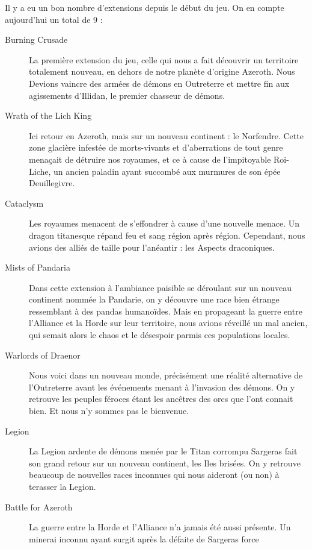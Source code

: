 \documentclass{article}
\begin{document}
Il y a eu un bon nombre d'extensions depuis le début du jeu. On en compte aujourd'hui un
total de 9 :

\begin{description}
    \item[Burning Crusade] La première extension du jeu, celle qui nous a fait découvrir
        un territoire totalement nouveau, en dehors de notre planète d'origine Azeroth. Nous
        Devions vaincre des armées de démons en Outreterre et mettre fin aux agissements
        d'Illidan, le premier chasseur de démons.
    \item[Wrath of the Lich King] Ici retour en Azeroth, mais sur un nouveau continent :
        le Norfendre. Cette zone glacière infestée de morts-vivants et d'aberrations de tout
        genre menaçait de détruire nos royaumes, et ce à cause de l'impitoyable Roi-Liche, un
        ancien paladin ayant succombé aux murmures de son épée Deuillegivre.
    \item[Cataclysm] Les royaumes menacent de s'effondrer à cause d'une nouvelle
        menace. Un dragon titanesque répand feu et sang région après région. Cependant,
        nous avions des alliés de taille pour l'anéantir : les Aspects draconiques.
    \item[Mists of Pandaria] Dans cette extension à l'ambiance paisible se déroulant sur
        un nouveau continent nommée la Pandarie, on y découvre une race bien étrange
        ressemblant à des pandas humanoïdes. Mais en propageant la guerre entre l'Alliance
        et la Horde sur leur territoire, nous avions réveillé un mal ancien, qui semait
        alors le chaos et le désespoir parmis ces populations locales.
    \item[Warlords of Draenor] Nous voici dans un nouveau monde, précisément une réalité
        alternative de l'Outreterre avant les événements menant à l'invasion des démons. On y
        retrouve les peuples féroces étant les ancêtres des orcs que l'ont connait bien.
        Et nous n'y sommes pas le bienvenue.
    \item[Legion] La Legion ardente de démons menée par le Titan corrompu Sargeras fait
        son grand retour sur un nouveau continent, les Iles brisées. On y retrouve
        beaucoup de nouvelles races inconnues qui nous aideront (ou non) à terasser la
        Legion.
    \item[Battle for Azeroth] La guerre entre la Horde et l'Alliance n'a jamais été
        aussi présente. Un minerai inconnu ayant surgit après la défaite de Sargeras force

\end{description}
\end{document}
